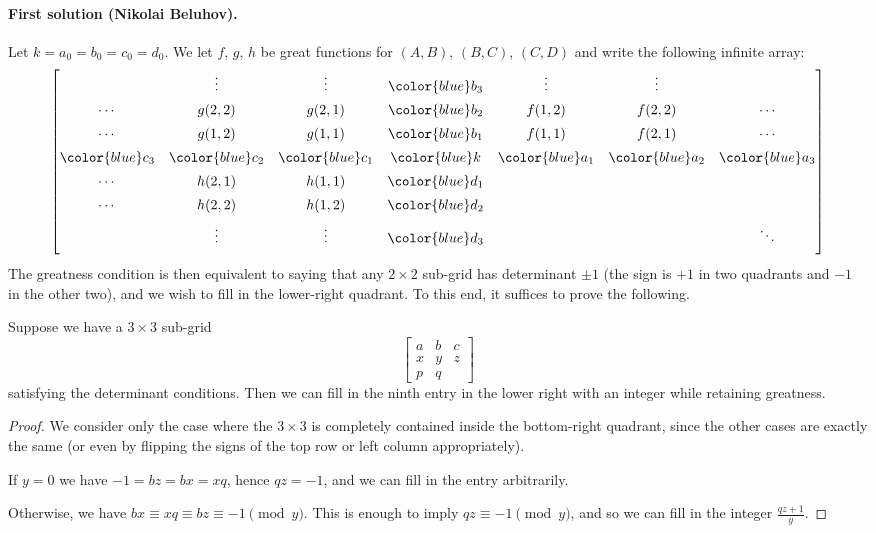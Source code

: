 \documentclass[11pt]{scrartcl}
\begin{document}
\paragraph{First solution (Nikolai Beluhov).}
Let $k = a_0 = b_0 = c_0 = d_0$.
We let $f$, $g$, $h$ be great functions for $(A,B)$, $(B,C)$, $(C,D)$
and write the following infinite array:
\[
  \begin{bmatrix}
    & \vdots & \vdots & {\color{blue} b_3} & \vdots & \vdots & \\[5pt]
    \dotsb & g(2,2) & g(2,1) & {\color{blue}b_2} & f(1,2) & f(2,2) & \dotsb \\[5pt]
    \dotsb & g(1,2) & g(1,1) & {\color{blue}b_1} & f(1,1) & f(2,1) & \dotsb \\[5pt]
    {\color{blue}c_3} & {\color{blue}c_2} & {\color{blue}c_1} &
      {\color{blue}k} &
      {\color{blue}a_1} & {\color{blue}a_2} & {\color{blue}a_3} \\[5pt]
    \dotsb & h(2,1) & h(1,1) & {\color{blue}d_1} & & & \\[5pt]
    \dotsb & h(2,2) & h(1,2) & {\color{blue}d_2} & & & \\[5pt]
    & \vdots & \vdots & {\color{blue}d_3} & & & \ddots \\[5pt]
  \end{bmatrix}
\]
The greatness condition is then equivalent to saying
that any $2 \times 2$ sub-grid has determinant $\pm1$
(the sign is $+1$ in two quadrants and $-1$ in the other two),
and we wish to fill in the lower-right quadrant.
To this end, it suffices to prove the following.
\begin{lemma*}
  Suppose we have a $3 \times 3$ sub-grid
  \[
    \begin{bmatrix}
      a & b & c \\
      x & y & z \\
      p & q &
    \end{bmatrix}
  \]
  satisfying the determinant conditions.
  Then we can fill in the ninth entry in the lower right
  with an integer while retaining greatness.
\end{lemma*}
\begin{proof}
  We consider only the case where the $3 \times 3$
  is completely contained inside the bottom-right quadrant,
  since the other cases are exactly the same
  (or even by flipping the signs of the top row
  or left column appropriately).

  If $y = 0$ we have $-1 = bz = bx = xq$, hence $qz = -1$,
  and we can fill in the entry arbitrarily.

  Otherwise, we have $bx \equiv xq \equiv bz \equiv -1 \pmod{y}$.
  This is enough to imply $qz \equiv -1 \pmod y$,
  and so we can fill in the integer $\frac{qz+1}{y}$.
\end{proof}
\end{document}
